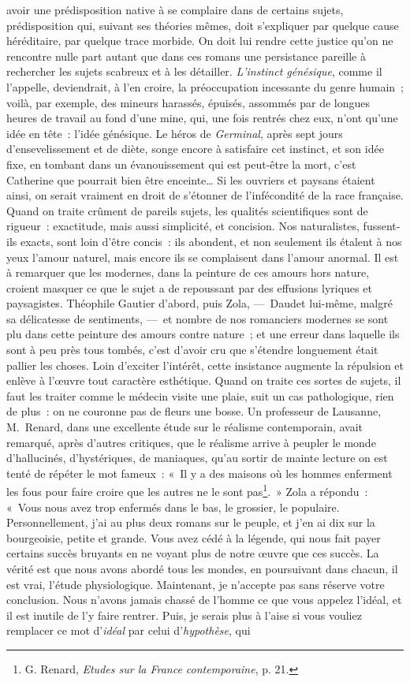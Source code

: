 \documentclass[french,twoside]{book} %
\begin{document}
avoir une prédisposition native à se complaire dans de certains sujets, prédisposition qui, suivant ses théories mêmes, doit s’expliquer par quelque cause héréditaire, par quelque trace morbide. On doit lui rendre cette justice qu’on ne rencontre nulle part autant que dans ces romans une persistance pareille à rechercher les sujets scabreux et à les détailler. \emph{L’instinct génésique}, comme il l’appelle, deviendrait, à l’en croire, la préoccupation incessante du genre humain ; voilà, par exemple, des mineurs harassés, épuisés, assommés par de longues heures de travail au fond d’une mine, qui, une fois rentrés chez eux, n’ont qu’une idée en tête : l’idée génésique. Le héros de \emph{Germinal}, après sept jours d’ensevelissement et de diète, songe encore à satisfaire cet instinct, et son idée fixe, en tombant dans un évanouissement qui est peut-être la mort, c’est Catherine que pourrait bien être enceinte… Si les ouvriers et paysans étaient ainsi, on serait vraiment en droit de s’étonner de l’infécondité de la race française. Quand on traite crûment de pareils sujets, les qualités scientifiques sont de rigueur : exactitude, mais aussi simplicité, et concision. Nos naturalistes, fussent-ils exacts, sont loin d’être concis : ils abondent, et non seulement ils étalent à nos yeux l’amour naturel, mais encore ils se complaisent dans l’amour anormal. Il est à remarquer que les modernes, dans la peinture de ces amours hors nature, croient masquer ce que le sujet a de repoussant par des effusions lyriques et paysagistes. Théophile Gautier d’abord, puis Zola, — Daudet lui-même, malgré sa délicatesse de sentiments, — et nombre de nos romanciers modernes se sont plu dans cette peinture des amours contre nature ; et une erreur dans laquelle ils sont à peu près tous tombés, c’est d’avoir cru que s’étendre longuement était pallier les choses. Loin d’exciter l’intérêt, cette insistance augmente la répulsion et enlève à l’œuvre tout caractère esthétique. Quand on traite ces sortes de sujets, il faut les traiter comme le médecin visite une plaie, suit un cas pathologique, rien de plus : on ne couronne pas de fleurs une bosse. Un professeur de Lausanne, M. Renard, dans une excellente étude sur le réalisme contemporain, avait remarqué, après d’autres critiques, que le réalisme arrive à peupler le monde d’hallucinés, d’hystériques, de maniaques, qu’au sortir de mainte lecture on est tenté de répéter le mot fameux : « Il y a des maisons où les hommes enferment les fous pour faire croire que les autres ne le sont pas\footnote{ G. Renard, \emph{Etudes sur la France contemporaine}, p. 21.}. » Zola a répondu : « Vous nous avez trop enfermés dans le bas, le grossier, le populaire. Personnellement, j’ai au plus deux romans sur le peuple, et j’en ai dix sur la bourgeoisie, petite et grande. Vous avez cédé à la légende, qui nous fait payer certains succès bruyants en ne voyant plus de notre œuvre que ces succès. La vérité est que nous avons abordé tous les mondes, en poursuivant dans chacun, il est vrai, l’étude physiologique. Maintenant, je n’accepte pas sans réserve votre conclusion. Nous n’avons jamais chassé de l’homme ce que vous appelez l’idéal, et il est inutile de l’y faire rentrer. Puis, je serais plus à l’aise si vous vouliez remplacer ce mot d’\emph{idéal} par celui d’\emph{hypothèse}, qui 
\end{document}
